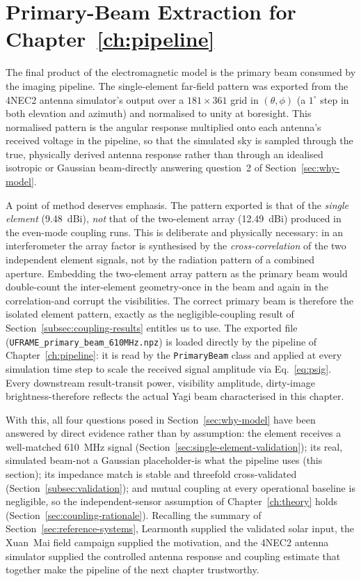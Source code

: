 \section{Primary-Beam Extraction for Chapter~\ref{ch:pipeline}}
\label{sec:primary-beam-extraction}

The final product of the electromagnetic model is the primary beam consumed by
the imaging pipeline. The single-element far-field pattern was exported from
the 4NEC2 antenna simulator's output over a $181\times361$ grid in
$(\theta,\phi)$ (a $1^{\circ}$ step in both elevation and azimuth) and
normalised to unity at boresight. This normalised pattern is the angular
response multiplied onto each antenna's received voltage in the pipeline, so
that the simulated sky is sampled through the true, physically derived
antenna response rather than through an idealised isotropic or Gaussian beam-directly
answering question~2 of Section~\ref{sec:why-model}.

A point of method deserves emphasis. The pattern exported is that of the
\emph{single element} (\SI{9.48}{dBi}), \emph{not} that of the two-element array
(\SI{12.49}{dBi}) produced in the even-mode coupling runs. This is deliberate
and physically necessary: in an interferometer the array factor is synthesised
by the \emph{cross-correlation} of the two independent element signals, not by
the radiation pattern of a combined aperture. Embedding the two-element array
pattern as the primary beam would double-count the inter-element geometry-once
in the beam and again in the correlation-and corrupt the visibilities. The
correct primary beam is therefore the isolated element pattern, exactly as the
negligible-coupling result of Section~\ref{subsec:coupling-results} entitles us
to use. The exported file (\texttt{UFRAME\_primary\_beam\_610MHz.npz}) is loaded
directly by the pipeline of Chapter~\ref{ch:pipeline}: it is read by the
\texttt{PrimaryBeam} class and applied at every simulation time step to scale
the received signal amplitude via Eq.~\eqref{eq:psig}. Every downstream
result-transit power, visibility amplitude, dirty-image brightness-therefore
reflects the actual Yagi beam characterised in this chapter.

With this, all four questions posed in Section~\ref{sec:why-model} have been
answered by direct evidence rather than by assumption: the element receives a
well-matched \SI{610}{\mega\hertz} signal (Section~\ref{sec:single-element-validation});
its real, simulated beam-not a Gaussian placeholder-is what the pipeline uses
(this section); its impedance match is stable and threefold cross-validated
(Section~\ref{subsec:validation}); and mutual coupling at every operational
baseline is negligible, so the independent-sensor assumption of
Chapter~\ref{ch:theory} holds (Section~\ref{sec:coupling-rationale}). Recalling
the summary of Section~\ref{sec:reference-systems}, Learmonth supplied the
validated solar input, the Xuan~Mai field campaign supplied the motivation, and
the 4NEC2 antenna simulator supplied the controlled antenna response and
coupling estimate that together make the pipeline of the next chapter
trustworthy.
\clearpage
